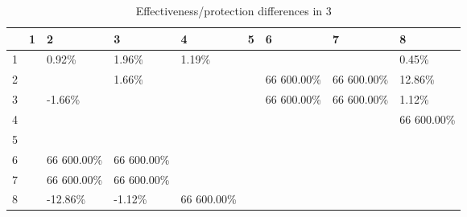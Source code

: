 \begin{table}[ht]
\centering
\begin{tabular}{rllllllll}
  \hline
 & 1 & 2 & 3 & 4 & 5 & 6 & 7 & 8 \\ 
  \hline
1 &  & 0.92\% & 1.96\% & 1.19\% &  &  &  & 0.45\% \\ 
  2 &  &  & 1.66\% &  &  & 66 600.00\% & 66 600.00\% & 12.86\% \\ 
  3 &  & -1.66\% &  &  &  & 66 600.00\% & 66 600.00\% & 1.12\% \\ 
  4 &  &  &  &  &  &  &  & 66 600.00\% \\ 
  5 &  &  &  &  &  &  &  &  \\ 
  6 &  & 66 600.00\% & 66 600.00\% &  &  &  &  &  \\ 
  7 &  & 66 600.00\% & 66 600.00\% &  &  &  &  &  \\ 
  8 &  & -12.86\% & -1.12\% & 66 600.00\% &  &  &  &  \\ 
   \hline
\end{tabular}
\caption{Effectiveness/protection differences in  3} 
\end{table}
